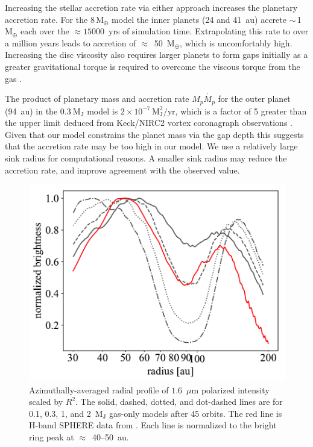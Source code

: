 \documentclass[usenatbib,a4paper,times]{mnras}
\renewcommand{\earth}{\mathrm{M}_{\oplus}}
\begin{document}
Increasing the stellar accretion rate via either approach increases the
planetary accretion rate. For the $8\,\earth{}$ model the inner planets (24 and
41~au) accrete $\sim\,$1~$\earth{}$ each over the $\approx 15000$~yrs of
simulation time. Extrapolating this rate to over a million years leads to
accretion of $\approx$~50~$\earth{}$, which is uncomfortably high. Increasing
the disc viscosity also requires larger planets to form gaps initially as a
greater gravitational torque is required to overcome the viscous torque from the
gas \citep{dipierro:2016}.

The product of planetary mass and accretion rate $M_p\dot{M_p}$ for the outer
planet (94~au) in the $0.3~\mathrm{M_J}$ model is $2\times 10^{-7}\,
\mathrm{M_J^2/yr}$, which is a factor of 5 greater than the upper limit deduced
from Keck/NIRC2 vortex coronagraph observations \citep{ruane:2017}. Given that
our model constrains the planet mass via the gap depth this suggests that the
accretion rate may be too high in our model. We use a relatively large sink
radius for computational reasons. A smaller sink radius may reduce the accretion
rate, and improve agreement with the observed value.

\begin{figure}
   \begin{center}
      \includegraphics[width=1.00\columnwidth]{figs/scattered-radial.pdf}
      \caption{Azimuthally-averaged radial profile of $1.6$~$\mu$m polarized
         intensity scaled by $R^2$. The solid, dashed, dotted, and dot-dashed
         lines are for 0.1, 0.3, 1, and 2~$\mathrm{M_J}$ gas-only models after
         45 orbits. The red line is H-band SPHERE data from
         \citet{van-boekel:2017}.  Each line is normalized to the bright ring
         peak at $\approx$~40--50~au.\label{fig:scattered-radial}}
   \end{center}
\end{figure}
\end{document}

